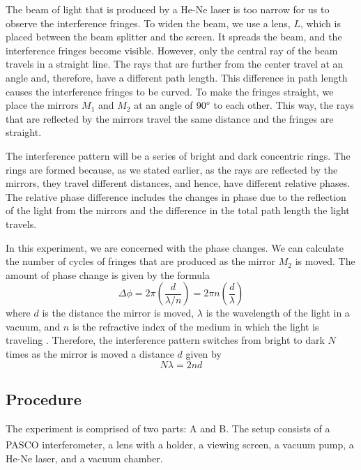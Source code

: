 \documentclass[10pt]{article}
\begin{document}
The beam of light that is produced by a He-Ne laser is too narrow for us to observe the interference fringes. To widen the beam, we use a lens, $L$, which is placed between the beam splitter and the screen. It spreads the beam, and the interference fringes become visible. However, only the central ray of the beam travels in a straight line. The rays that are further from the center travel at an angle and, therefore, have a different path length. This difference in path length causes the interference fringes to be curved. To make the fringes straight, we place the mirrors $M_1$ and $M_2$ at an angle of $90\degree$ to each other. This way, the rays that are reflected by the mirrors travel the same distance and the fringes are straight. 

The interference pattern will be a series of bright and dark concentric rings. The rings are formed because, as we stated earlier, as the rays are reflected by the mirrors, they travel different distances, and hence, have different relative phases. The relative phase difference includes the changes in phase due to the reflection of the light from the mirrors and the difference in the total path length the light travels. 

In this experiment, we are concerned with the phase changes. We can calculate the number of cycles of fringes that are produced as the mirror $M_2$ is moved. The amount of phase change is given by the formula
\begin{equation}
  \Delta \phi = 2 \pi \left(\dfrac{d}{\lambda/n}\right) = 2 \pi n \left(\dfrac{d}{\lambda}\right)
  \label{eq:1}
\end{equation}
where $d$ is the distance the mirror is moved, $\lambda$ is the wavelength of the light in a vacuum, and $n$ is the refractive index of the medium in which the light is traveling \cite{Pedrotti_2006}. Therefore, the interference pattern switches from bright to dark $N$ times as the mirror is moved a distance $d$ given by
\begin{equation}
  N \lambda = 2 n d
  \label{eq:2}
\end{equation}

\subsection*{Procedure}

The experiment is comprised of two parts: A and B. The setup consists of a PASCO{\textsuperscript\textregistered} interferometer, a lens with a holder, a viewing screen, a vacuum pump, a He-Ne laser, and a vacuum chamber.
\end{document}
